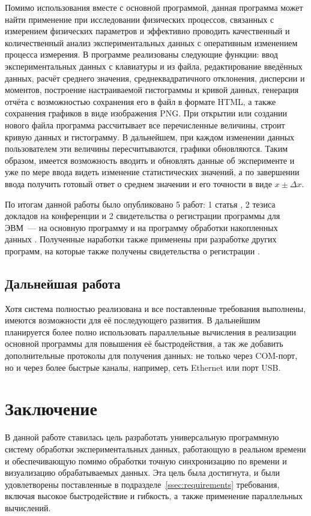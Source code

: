 \documentclass[a4paper, 14pt, titlepage]{extarticle}
\newcommand\sectiontoc[1]{\section*{\centering #1}\addcontentsline{toc}{section}{#1}}
\let\oldsection\section
\renewcommand{\section}{\newpage\oldsection}
\begin{document}
  Помимо использования вместе с основной программой, данная программа может найти применение при
  исследовании физических процессов, связанных с измерением физических параметров и эффективно
  проводить качественный и количественный анализ экспериментальных данных с оперативным изменением
  процесса измерения. В программе реализованы следующие функции: ввод экспериментальных данных с
  клавиатуры и из файла, редактирование введённых данных, расчёт среднего значения,
  среднеквадратичного отклонения, дисперсии и моментов, построение настраиваемой гистограммы и кривой
  данных, генерация отчёта с возможностью сохранения его в файл в формате HTML, а также сохранения
  графиков в виде изображения PNG. При открытии или создании нового файла программа рассчитывает все
  перечисленные величины, строит кривую данных и гистограмму. В дальнейшем, при каждом
  изменении данных пользователем эти величины пересчитываются, графики обновляются. Таким образом,
  имеется возможность вводить и обновлять данные об эксперименте и уже по мере ввода видеть
  изменение статистических значений, а по завершении ввода получить готовый ответ о среднем значении
  и его точности в виде $x \pm \Delta x$.

  По итогам данной работы было опубликовано 5 работ: 1 статья \cite{nia-bogatov-13}, 2 тезиса
  докладов на конференции \cite{nia-sno-13, nia-tumaev-13} и 2 свидетельства о регистрации программы
  для ЭВМ~--- на основную программу \cite{nia-seismoreg} и на программу обработки накопленных
  данных \cite{nia-processdata}. Полученные наработки также применены при разработке других программ,
  на которые также получены свидетельства о регистрации \cite{nia-semiconductor,
  nia-med-measurements}.


  \subsection{Дальнейшая работа}

  Хотя система полностью реализована и все поставленные требования выполнены, имеются
  возможности для её последующего развития. В дальнейшим планируется более полно использовать
  параллельные вычисления в реализации основной программы для повышения её быстродействия, а так же
  добавить дополнительные протоколы для получения данных: не только через COM-порт, но и через более
  быстрые каналы, например, сеть Ethernet или порт USB.

  \sectiontoc{Заключение}

  В данной работе ставилась цель разработать универсальную программную систему обработки экспериментальных данных,
  работающую в реальном времени и обеспечивающую помимо обработки точную синхронизацию по времени и
  визуализацию обрабатываемых данных. Эта цель была достигнута, и были удовлетворены поставленные в
  подразделе~\ref{ssec:requirements} требования, включая высокое быстродействие и гибкость, а~также применение
  параллельных вычислений.
\end{document}
